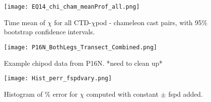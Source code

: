 \documentclass{ametsoc}
\begin{document}




\begin{figure}[t]
  \noindent\texttt{[image: EQ14\_chi\_cham\_meanProf\_all.png]}\\
  \caption{Time mean of $\chi$ for all CTD-$\chi$pod - chameleon cast pairs, with 95\% bootstrap confidence intervals.}
  \label{ctd_cham_chi_boot_all}
\end{figure}

\begin{figure}[t]
  \noindent\texttt{[image: P16N\_BothLegs\_Transect\_Combined.png]}\\
  \caption{Example chipod data from P16N. *need to clean up*}
  \label{}
\end{figure}


\begin{figure}[t]
  \noindent\texttt{[image: Hist\_perr\_fspdvary.png]}\\
  \caption{Histogram of \% error for $\chi$ computed with constant $\pm$ fspd added.}
  \label{FspdSensHist}
\end{figure}
\end{document}
